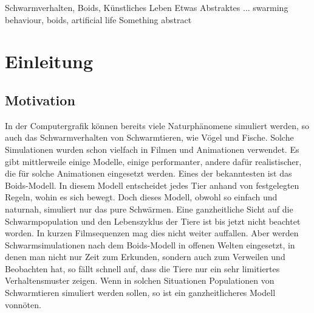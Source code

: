 \documentclass[draft=false
              ,paper=a4
              ,twoside=false
              ,fontsize=11pt
              ,headsepline
              ,BCOR10mm
              ,DIV11
              ,bibtotoc
              ,liststotoc
              ]{scrbook}
\begin{document}


\frontmatter

\maketitle

\onehalfspacing

\HAWAbstractPage
{Schwarmverhalten, Boids, Künstliches Leben}%
{Etwas Abstraktes ...}
{swarming behaviour, boids, artificial life}%
{Something abstract}

\newpage
\singlespacing

\tableofcontents
\newpage
\listoftables
\listoffigures

\mainmatter
\onehalfspacing

\chapter{Einleitung}\label{einleitung}
\section{Motivation}
In der Computergrafik können bereits viele Naturphänomene simuliert werden, so auch das Schwarmverhalten von Schwarmtieren, wie Vögel und Fische.
Solche Simulationen wurden schon vielfach in Filmen und Animationen verwendet. Es gibt mittlerweile einige Modelle, einige performanter, andere dafür realistischer, die für solche Animationen eingesetzt werden. Eines der bekanntesten ist das Boids-Modell. In diesem Modell entscheidet jedes Tier anhand von festgelegten Regeln, wohin es sich bewegt. Doch dieses Modell, obwohl so einfach und naturnah, simuliert nur das pure Schwärmen. Eine ganzheitliche Sicht auf die Schwarmpopulation und den Lebenszyklus der Tiere ist bis jetzt nicht beachtet worden. In kurzen Filmsequenzen mag dies nicht weiter auffallen. Aber werden Schwarmsimulationen nach dem Boids-Modell in offenen Welten eingesetzt, in denen man nicht nur Zeit zum Erkunden, sondern auch zum Verweilen und Beobachten hat, so fällt schnell auf, dass die Tiere nur ein sehr limitiertes Verhaltensmuster zeigen.
Wenn in solchen Situationen Populationen von Schwarmtieren simuliert werden sollen, so ist ein ganzheitlicheres Modell vonnöten.
\end{document}
